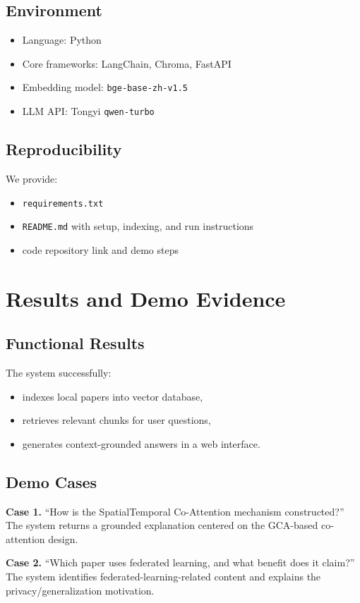 \documentclass[11pt,a4paper]{article}
\begin{document}
\subsection{Environment}
\begin{itemize}[leftmargin=1.4em]
  \item Language: Python
  \item Core frameworks: LangChain, Chroma, FastAPI
  \item Embedding model: \texttt{bge-base-zh-v1.5}
  \item LLM API: Tongyi \texttt{qwen-turbo}
\end{itemize}

\subsection{Reproducibility}
We provide:
\begin{itemize}[leftmargin=1.4em]
  \item \texttt{requirements.txt}
  \item \texttt{README.md} with setup, indexing, and run instructions
  \item code repository link and demo steps
\end{itemize}

\section{Results and Demo Evidence}
\subsection{Functional Results}
The system successfully:
\begin{itemize}[leftmargin=1.4em]
  \item indexes local papers into vector database,
  \item retrieves relevant chunks for user questions,
  \item generates context-grounded answers in a web interface.
\end{itemize}

\subsection{Demo Cases}
\textbf{Case 1.} ``How is the SpatialTemporal Co-Attention mechanism constructed?''
The system returns a grounded explanation centered on the GCA-based co-attention design.

\textbf{Case 2.} ``Which paper uses federated learning, and what benefit does it claim?''
The system identifies federated-learning-related content and explains the privacy/generalization motivation.
\end{document}

